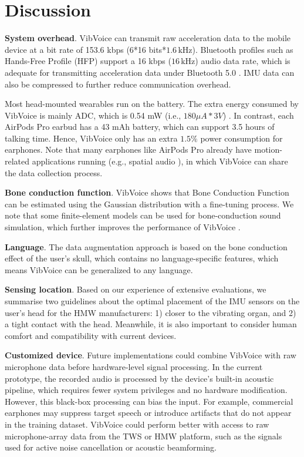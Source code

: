 \section{Discussion}
\noindent\textbf{System overhead}.
VibVoice can transmit raw acceleration data to the mobile device at a bit rate of 153.6 kbps (6*16 bits*$1.6\,\text{kHz}$). Bluetooth profiles such as Hands-Free Profile (HFP) support a 16 kbps ($16\,\text{kHz}$) audio data rate, which is adequate for transmitting acceleration data under Bluetooth 5.0 \citep{Bluetoot0:online}. IMU data can also be compressed to further reduce communication overhead.

Most head-mounted wearables run on the battery. The extra energy consumed by VibVoice is mainly ADC, which is 0.54 mW (i.e., $180 \mu A * 3 V$) \citep{Inertial63:online}. In contrast, each AirPods Pro earbud has a 43 mAh battery, which can support 3.5 hours of talking time. Hence, VibVoice only has an extra $1.5\%$ power consumption for earphones. Note that many earphones like AirPods Pro already have motion-related applications running (e.g., spatial audio \citep{spatial-audio}), in which VibVoice can share the data collection process.

\noindent\textbf{Bone conduction function}.
VibVoice shows that Bone Conduction Function can be estimated using the Gaussian distribution with a fine-tuning process. We note that some finite-element models can be used for bone-conduction sound simulation, which further improves the performance of VibVoice \citep{chang2016development}.

\noindent\textbf{Language}.
The data augmentation approach is based on the bone conduction effect of the user's skull, which contains no language-specific features, which means VibVoice can be generalized to any language.

\noindent\textbf{Sensing location}.
Based on our experience of extensive evaluations, we summarise two guidelines about the optimal placement of the IMU sensors on the user's head for the HMW manufacturers: 1) closer to the vibrating organ, and 2) a tight contact with the head. Meanwhile, it is also important to consider human comfort and compatibility with current devices.

\noindent\textbf{Customized device}.
Future implementations could combine VibVoice with raw microphone data before hardware-level signal processing. In the current prototype, the recorded audio is processed by the device's built-in acoustic pipeline, which requires fewer system privileges and no hardware modification. However, this black-box processing can bias the input. For example, commercial earphones may suppress target speech or introduce artifacts that do not appear in the training dataset. VibVoice could perform better with access to raw microphone-array data from the TWS or HMW platform, such as the signals used for active noise cancellation or acoustic beamforming.
